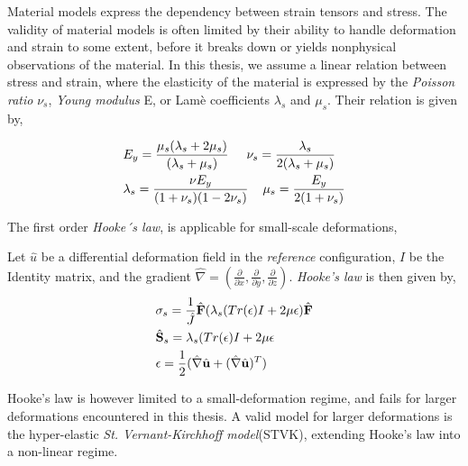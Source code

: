 Material models express the dependency between strain tensors and stress. The validity of material models is often limited by their ability to handle deformation and strain to some extent, before it breaks down or yields nonphysical observations of the material. In this thesis, we assume a linear relation between stress and strain, where the elasticity of the material is expressed by the \textit{Poisson ratio} $\nu_s$, \textit{Young modulus} E, or Lamè coefficients  $\lambda_s$ and $\mu_s$. Their relation is given by,

\begin{align*}
&E_y = \frac{ \mu_s ( \lambda_s + 2 \mu_s) }{ ( \lambda_s + \mu_s ) } 
\hspace{5mm} \nu_s = \frac{\lambda_s}{2(\lambda_s + \mu_s)} \\
&\lambda_s = \frac{\nu E_y}{(1 + \nu_s)(1 - 2\nu_s)} \hspace{4mm} \mu_s = \frac{E_y}{2(1 + \nu_s)} 
\end{align*}


The first order \textit{Hooke´s law}, is applicable for small-scale deformations,
\begin{defn}
Let $\hat{u}$ be a differential deformation field in the \textit{reference} configuration, $I$ be the Identity matrix, and the gradient $\hat{\nabla} = (\frac{\partial}{\partial x}, \frac{\partial}{\partial y}, \frac{\partial}{\partial z}) $. \textit{Hooke's law} is then given by,
\begin{align*}
&\sigma_s = \frac{1}{\hat{J}} \hat{\mathbf{F}}(\lambda_s(Tr(\epsilon) I + 2 \mu  \epsilon)\hat{\mathbf{F}} \\
&\hat{\mathbf{S}}_s = \lambda_s(Tr(\epsilon) I + 2 \mu \epsilon \\
&\epsilon = \frac{1}{2}(\hat{\nabla} \hat{\mathbf{u}} + (\hat{\nabla} \hat{\mathbf{u}})^T ) 
\end{align*} 
\end{defn}

Hooke's law is however limited to a small-deformation regime, and fails for larger deformations encountered in this thesis. A valid model for larger deformations is the  hyper-elastic \textit{St. \@ Vernant-Kirchhoff model}(STVK), 
extending Hooke's law into a non-linear regime.

